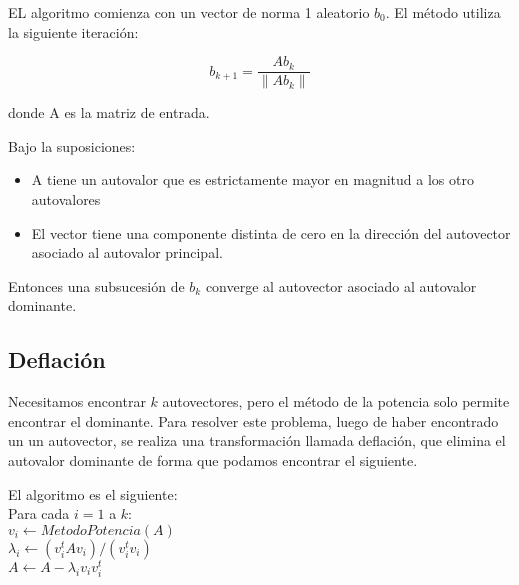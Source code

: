 EL algoritmo comienza con un vector de norma 1 aleatorio $b_0$. El método utiliza la siguiente iteración: 

$$b_{k+1} = \frac{Ab_k}{\|Ab_k\|}$$

donde A es la matriz de entrada.

Bajo la suposiciones: 
\begin{itemize}
  \item A tiene un autovalor que es estrictamente mayor en magnitud a los otro autovalores
  \item El vector tiene una componente distinta de cero en la dirección del autovector asociado al autovalor principal.
\end{itemize}

Entonces una subsucesión de $b_k$ converge al autovector asociado al autovalor dominante.
 
 
\subsection{Deflación}
Necesitamos encontrar $k$ autovectores, pero el método de la potencia solo permite encontrar el dominante. Para resolver este problema, 
luego de haber encontrado un un autovector, se realiza una transformación llamada deflación,
que elimina el autovalor dominante de forma que podamos encontrar el siguiente.
 
El algoritmo es el siguiente: \\

Para cada $i=1$ a $k$: \\
\indent \indent$v_i \leftarrow MetodoPotencia(A)$ \\
\indent \indent$\lambda_i \leftarrow (v_i^t A v_i) / ( v_i^t v_i)$\\
\indent \indent$A \leftarrow A - \lambda_i v_i v_i^t$ \\

 